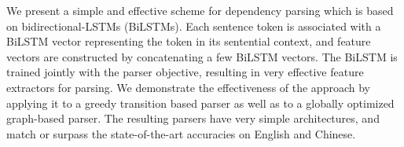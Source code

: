 We present a simple and effective scheme for dependency parsing which is based on bidirectional-LSTMs (BiLSTMs). Each sentence token is associated with a BiLSTM vector representing the token in its sentential context, and feature vectors are constructed by concatenating a few BiLSTM vectors. The BiLSTM is trained jointly with the parser objective, resulting in very effective feature extractors for parsing. We demonstrate the effectiveness of the approach by applying it to a greedy transition based parser as well as to a globally optimized graph-based parser. The resulting parsers have very simple architectures, and match or surpass the state-of-the-art accuracies on English and Chinese.

